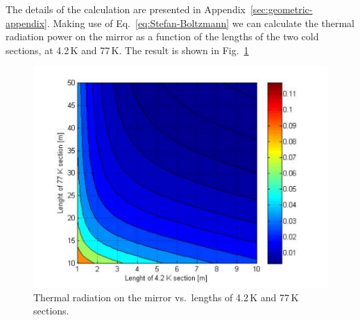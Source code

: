 The details of the calculation are presented in Appendix~\ref{sec:geometric-appendix}. Making use of Eq.~\ref{eq:Stefan-Boltzmann} we can calculate the thermal radiation power on the mirror as a function of the lengths of the two cold sections, at 4.2\,K and 77\,K. The result is shown in Fig.~\ref{fig:contour}
\begin{figure}[htbp]
\begin{center}
 \includegraphics[width=12cm]{Sec_SiteInfra/Cryotraps/contour.pdf}
			\caption{Thermal radiation on the mirror vs.\ lengths of 4.2\,K and 77\,K sections.}
\label{fig:contour}
\end{center}
\end{figure}


